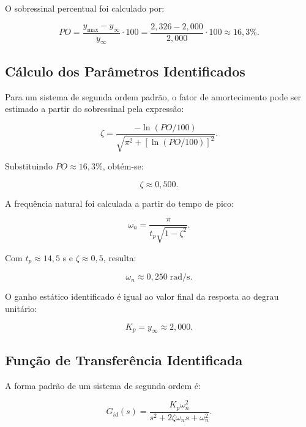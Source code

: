 \documentclass[12pt,a4paper]{article}
\begin{document}
O sobressinal percentual foi calculado por:

\begin{equation}
  PO=\frac{y_{\max}-y_{\infty}}{y_{\infty}}\cdot100
  =\frac{2{,}326-2{,}000}{2{,}000}\cdot100
  \approx16{,}3\%.
\end{equation}

\subsection{Cálculo dos Parâmetros Identificados}

Para um sistema de segunda ordem padrão, o fator de amortecimento pode ser estimado a partir do sobressinal pela expressão:

\begin{equation}
  \zeta=\frac{-\ln(PO/100)}{\sqrt{\pi^2+\left[\ln(PO/100)\right]^2}}.
\end{equation}

Substituindo $PO\approx16{,}3\%$, obtém-se:

\begin{equation}
  \zeta\approx0{,}500.
\end{equation}

A frequência natural foi calculada a partir do tempo de pico:

\begin{equation}
  \omega_n=\frac{\pi}{t_p\sqrt{1-\zeta^2}}.
\end{equation}

Com $t_p\approx14{,}5$ s e $\zeta\approx0{,}5$, resulta:

\begin{equation}
  \omega_n\approx0{,}250\;\text{rad/s}.
\end{equation}

O ganho estático identificado é igual ao valor final da resposta ao degrau unitário:

\begin{equation}
  K_p=y_{\infty}\approx2{,}000.
\end{equation}

\subsection{Função de Transferência Identificada}

A forma padrão de um sistema de segunda ordem é:

\begin{equation}
  G_{id}(s)=\frac{K_p\omega_n^2}{s^2+2\zeta\omega_n s+\omega_n^2}.
\end{equation}
\end{document}
